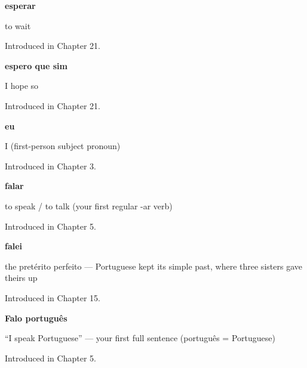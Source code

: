 \noindent\begin{minipage}[t]{\linewidth}
\raggedright
\textbf{esperar}\par
\small to wait\par
\footnotesize Introduced in Chapter 21.
\end{minipage}\par\medskip

\noindent\begin{minipage}[t]{\linewidth}
\raggedright
\textbf{espero que sim}\par
\small I hope so\par
\footnotesize Introduced in Chapter 21.
\end{minipage}\par\medskip

\noindent\begin{minipage}[t]{\linewidth}
\raggedright
\textbf{eu}\par
\small I (first-person subject pronoun)\par
\footnotesize Introduced in Chapter 3.
\end{minipage}\par\medskip

\noindent\begin{minipage}[t]{\linewidth}
\raggedright
\textbf{falar}\par
\small to speak / to talk (your first regular -ar verb)\par
\footnotesize Introduced in Chapter 5.
\end{minipage}\par\medskip

\noindent\begin{minipage}[t]{\linewidth}
\raggedright
\textbf{falei}\par
\small the pretérito perfeito — Portuguese kept its simple past, where three sisters gave theirs up\par
\footnotesize Introduced in Chapter 15.
\end{minipage}\par\medskip

\noindent\begin{minipage}[t]{\linewidth}
\raggedright
\textbf{Falo português}\par
\small \textquotedblleft{}I speak Portuguese\textquotedblright{} — your first full sentence (português = Portuguese)\par
\footnotesize Introduced in Chapter 5.
\end{minipage}\par\medskip

